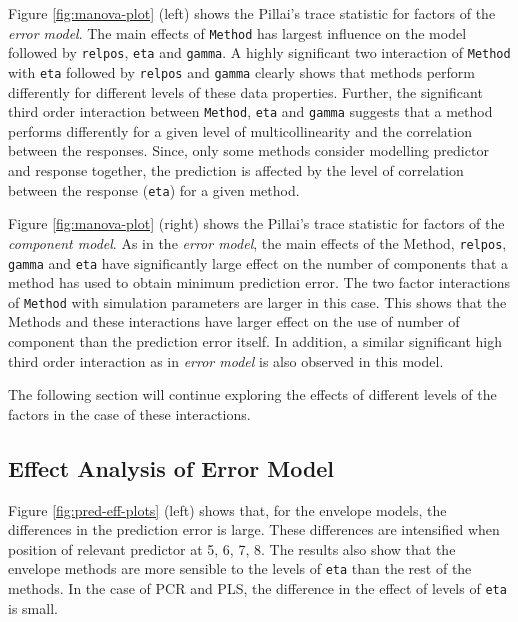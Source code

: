 \documentclass[12pt,3p,authoryear]{elsarticle}
\providecommand{\tightlist}{%
  \setlength{\itemsep}{0pt}\setlength{\parskip}{0pt}}
\begin{document}
\begin{description}
\tightlist
\item[\emph{Error Model}:]
Figure \ref{fig:manova-plot} (left) shows the Pillai's trace statistic
for factors of the \emph{error model}. The main effects of
\texttt{Method} has largest influence on the model followed by
\texttt{relpos}, \texttt{eta} and \texttt{gamma}. A highly significant
two interaction of \texttt{Method} with \texttt{eta} followed by
\texttt{relpos} and \texttt{gamma} clearly shows that methods perform
differently for different levels of these data properties. Further, the
significant third order interaction between \texttt{Method},
\texttt{eta} and \texttt{gamma} suggests that a method performs
differently for a given level of multicollinearity and the correlation
between the responses. Since, only some methods consider modelling
predictor and response together, the prediction is affected by the level
of correlation between the response (\texttt{eta}) for a given method.
\item[\emph{Component Model}:]
Figure \ref{fig:manova-plot} (right) shows the Pillai's trace statistic
for factors of the \emph{component model}. As in the \emph{error model},
the main effects of the Method, \texttt{relpos}, \texttt{gamma} and
\texttt{eta} have significantly large effect on the number of components
that a method has used to obtain minimum prediction error. The two
factor interactions of \texttt{Method} with simulation parameters are
larger in this case. This shows that the Methods and these interactions
have larger effect on the use of number of component than the prediction
error itself. In addition, a similar significant high third order
interaction as in \emph{error model} is also observed in this model.
\end{description}

The following section will continue exploring the effects of different
levels of the factors in the case of these interactions.

\subsection{Effect Analysis of Error
Model}\label{effect-analysis-of-error-model}

Figure \ref{fig:pred-eff-plots} (left) shows that, for the envelope
models, the differences in the prediction error is large. These
differences are intensified when position of relevant predictor at 5, 6,
7, 8. The results also show that the envelope methods are more sensible
to the levels of \texttt{eta} than the rest of the methods. In the case
of PCR and PLS, the difference in the effect of levels of \texttt{eta}
is small.
\end{document}
